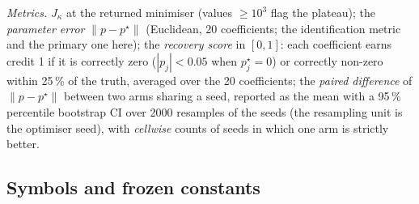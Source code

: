 \documentclass[11pt]{article}
\theoremstyle{remark}\newtheorem{remark}{Remark}
\newcommand{\pstar}{p^\star}
\newcommand{\norm}[1]{\lVert #1\rVert}
\begin{document}
\emph{Metrics.} $J_\kappa$ at the returned minimiser (values $\ge10^3$ flag the plateau); the \emph{parameter error} $\norm{p-\pstar}$ (Euclidean, 20 coefficients; the identification metric and the primary one here); the \emph{recovery score} in $[0,1]$: each coefficient earns credit 1 if it is correctly zero ($|p_j|<0.05$ when $\pstar_j=0$) or correctly non-zero within 25\,\% of the truth, averaged over the 20 coefficients; the \emph{paired difference} of $\norm{p-\pstar}$ between two arms sharing a seed, reported as the mean with a 95\,\% percentile bootstrap CI over 2000 resamples of the seeds (the resampling unit is the optimiser seed), with \emph{cellwise} counts of seeds in which one arm is strictly better.

\subsection{Symbols and frozen constants}\label{sec:symbols}
\end{document}
